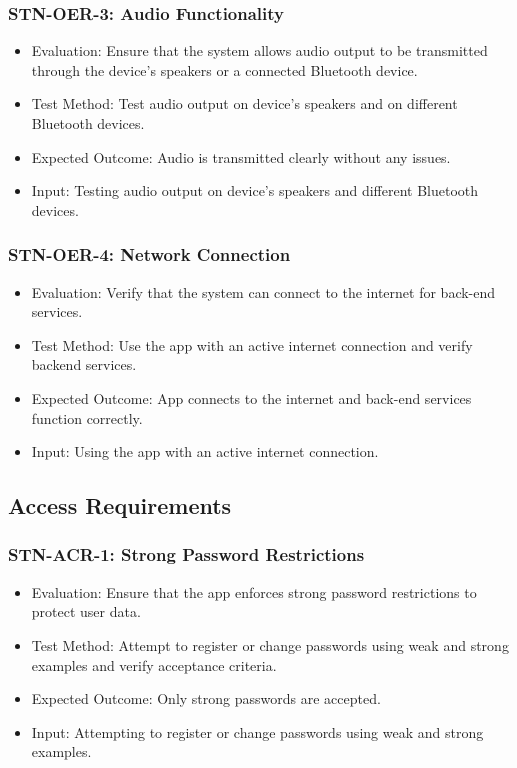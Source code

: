 \documentclass[12pt, titlepage]{article}
\begin{document}
\subsubsection{STN-OER-3: Audio Functionality}
\begin{itemize}
    \item Evaluation: Ensure that the system allows audio output to be transmitted through the device's speakers or a connected Bluetooth device.
    \item Test Method: Test audio output on device's speakers and on different Bluetooth devices.
    \item Expected Outcome: Audio is transmitted clearly without any issues.
    \item Input: Testing audio output on device's speakers and different Bluetooth devices.
\end{itemize}

\subsubsection{STN-OER-4: Network Connection}
\begin{itemize}
    \item Evaluation: Verify that the system can connect to the internet for back-end services.
    \item Test Method: Use the app with an active internet connection and verify backend services.
    \item Expected Outcome: App connects to the internet and back-end services function correctly.
    \item Input: Using the app with an active internet connection.
\end{itemize}

\subsection{Access Requirements}

\subsubsection{STN-ACR-1: Strong Password Restrictions}
\begin{itemize}
    \item Evaluation: Ensure that the app enforces strong password restrictions to protect user data.
    \item Test Method: Attempt to register or change passwords using weak and strong examples and verify acceptance criteria.
    \item Expected Outcome: Only strong passwords are accepted.
    \item Input: Attempting to register or change passwords using weak and strong examples.
\end{itemize}
\end{document}
